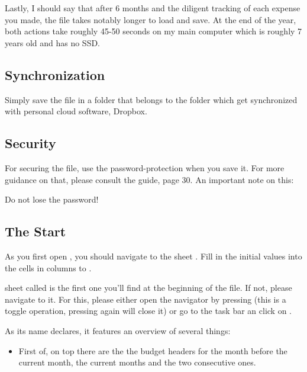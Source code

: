 Lastly, I should say that after 6 months and the diligent tracking of each expense you made, the file takes notably longer to load and save.
At the end of the year, both actions take roughly 45-50 seconds on my main computer which is roughly 7 years old and has no SSD.

\subsection{Synchronization}
\label{subsec:synchronization}

Simply save the file in a folder that belongs to the folder which get synchronized with personal cloud software, \eg Dropbox.

\subsection{Security}
\label{subsec:security}

For securing the file, use the password-protection when you save it.
For more guidance on that, please consult the  guide, page 30.
An important note on this:
\begin{specialnote}
Do not lose the password!
\end{specialnote}

\subsection{The Start}
\label{subsec:opening-the-file}

As you first open \tfn, you should navigate to the sheet .
Fill in the initial values into the cells in columns  to .

sheet called  is the first one you'll find at the beginning of the file.
If not, please navigate to it.
For this, please either open the navigator by pressing  (this is a toggle operation, pressing  again will close it) or go to the task bar an click on  \structurenext {}.

As its name declares, it features an overview of several things:
\begin{itemize}
	\item First of, on top there are the the budget headers for the month before the current month, the current months and the two consecutive ones.
\end{itemize}

